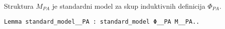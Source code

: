 \begin{proposition}
  Struktura \(M_{\mathit{PA}}\) je standardni model za skup induktivnih definicija \(\Phi_{\mathit{PA}}\).
\begin{verbatim}
Lemma standard_model__PA : standard_model Φ__PA M__PA..
\end{verbatim}
\end{proposition}


